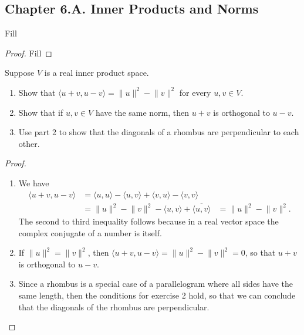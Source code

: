 \subsection*{Chapter 6.A. Inner Products and Norms}


\begin{exercise}{3}
  Fill
\end{exercise}
\begin{proof}
 Fill
\end{proof}

\begin{exercise}{4}
  Suppose $V$ is a real inner product space.
    \begin{enumerate}
        \item Show that $\langle u+v,u-v\rangle=\lVert u\rVert^2-\lVert v\rVert^2$ for every $u,v\in V$.
        \item Show that if $u,v\in V$ have the same norm, then $u+v$ is orthogonal to $u-v$.
        \item Use part 2 to show that the diagonals of a rhombus are perpendicular to each other.
    \end{enumerate}  
\end{exercise}
\begin{proof}
 \begin{enumerate}
     \item We have 
     \begin{align*}
        \langle u+v,u-v\rangle &= \langle u,u\rangle-\langle u,v\rangle+\langle v,u\rangle-\langle v,v\rangle\\
        &= \lVert u\rVert^2-\lVert v\rVert^2 -\langle u,v\rangle+\overline{\langle u,v\rangle}
        &= \lVert u\rVert^2-\lVert v\rVert^2.
     \end{align*}
     The second to third inequality follows because in a real vector space the complex conjugate of a number is itself.
     \item If $\lVert u\rVert^2=\lVert v\rVert^2$, then $\langle u+v,u-v\rangle=\lVert u\rVert^2-\lVert v\rVert^2=0$, so that $u+v$ is orthogonal to $u-v$.
     \item Since a rhombus is a special case of a parallelogram where all sides have the same length, then the conditions for exercise 2 hold, so that we can conclude that the diagonals of the rhombus are perpendicular.
 \end{enumerate}
\end{proof}

